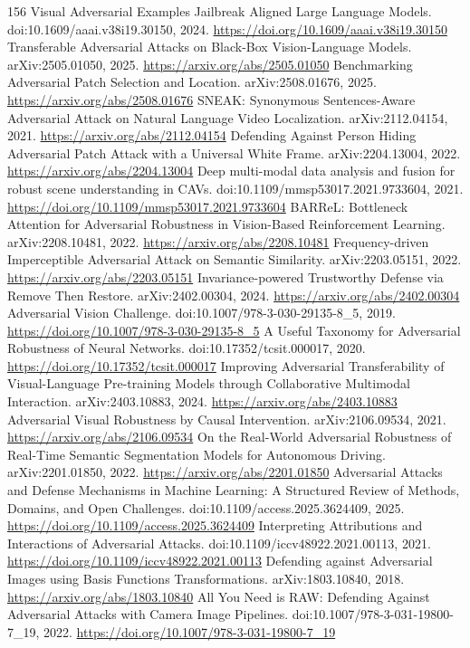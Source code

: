 \documentclass[11pt]{article}
\begin{document}
\begin{thebibliography}{156}
 Visual Adversarial Examples Jailbreak Aligned Large Language Models. doi:10.1609/aaai.v38i19.30150, 2024. \url{https://doi.org/10.1609/aaai.v38i19.30150}
 Transferable Adversarial Attacks on Black-Box Vision-Language Models. arXiv:2505.01050, 2025. \url{https://arxiv.org/abs/2505.01050}
 Benchmarking Adversarial Patch Selection and Location. arXiv:2508.01676, 2025. \url{https://arxiv.org/abs/2508.01676}
 SNEAK: Synonymous Sentences-Aware Adversarial Attack on Natural Language Video Localization. arXiv:2112.04154, 2021. \url{https://arxiv.org/abs/2112.04154}
 Defending Against Person Hiding Adversarial Patch Attack with a Universal White Frame. arXiv:2204.13004, 2022. \url{https://arxiv.org/abs/2204.13004}
 Deep multi-modal data analysis and fusion for robust scene understanding in CAVs. doi:10.1109/mmsp53017.2021.9733604, 2021. \url{https://doi.org/10.1109/mmsp53017.2021.9733604}
 BARReL: Bottleneck Attention for Adversarial Robustness in Vision-Based Reinforcement Learning. arXiv:2208.10481, 2022. \url{https://arxiv.org/abs/2208.10481}
 Frequency-driven Imperceptible Adversarial Attack on Semantic Similarity. arXiv:2203.05151, 2022. \url{https://arxiv.org/abs/2203.05151}
 Invariance-powered Trustworthy Defense via Remove Then Restore. arXiv:2402.00304, 2024. \url{https://arxiv.org/abs/2402.00304}
 Adversarial Vision Challenge. doi:10.1007/978-3-030-29135-8\_5, 2019. \url{https://doi.org/10.1007/978-3-030-29135-8_5}
 A Useful Taxonomy for Adversarial Robustness of Neural Networks. doi:10.17352/tcsit.000017, 2020. \url{https://doi.org/10.17352/tcsit.000017}
 Improving Adversarial Transferability of Visual-Language Pre-training Models through Collaborative Multimodal Interaction. arXiv:2403.10883, 2024. \url{https://arxiv.org/abs/2403.10883}
 Adversarial Visual Robustness by Causal Intervention. arXiv:2106.09534, 2021. \url{https://arxiv.org/abs/2106.09534}
 On the Real-World Adversarial Robustness of Real-Time Semantic Segmentation Models for Autonomous Driving. arXiv:2201.01850, 2022. \url{https://arxiv.org/abs/2201.01850}
 Adversarial Attacks and Defense Mechanisms in Machine Learning: A Structured Review of Methods, Domains, and Open Challenges. doi:10.1109/access.2025.3624409, 2025. \url{https://doi.org/10.1109/access.2025.3624409}
 Interpreting Attributions and Interactions of Adversarial Attacks. doi:10.1109/iccv48922.2021.00113, 2021. \url{https://doi.org/10.1109/iccv48922.2021.00113}
 Defending against Adversarial Images using Basis Functions Transformations. arXiv:1803.10840, 2018. \url{https://arxiv.org/abs/1803.10840}
 All You Need is RAW: Defending Against Adversarial Attacks with Camera Image Pipelines. doi:10.1007/978-3-031-19800-7\_19, 2022. \url{https://doi.org/10.1007/978-3-031-19800-7_19}
\end{thebibliography}
\end{document}
